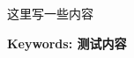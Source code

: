 
\begin{abstract}
    这里写一些内容
    \par{}
\end{abstract}

\begin{abstract*}
   这里写一些内容
    \par\textbf{Keywords: 测试内容}
\end{abstract*}
